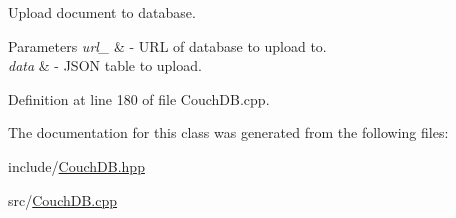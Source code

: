 Upload document to database. 


\begin{DoxyParams}{Parameters}
{\em url\+\_\+} & -\/ U\+RL of database to upload to. \\
\hline
{\em data} & -\/ J\+S\+ON table to upload. \\
\hline
\end{DoxyParams}


Definition at line 180 of file Couch\+D\+B.\+cpp.



The documentation for this class was generated from the following files\+:\begin{DoxyCompactItemize}
\item 
include/\hyperlink{_couch_d_b_8hpp}{Couch\+D\+B.\+hpp}\item 
src/\hyperlink{_couch_d_b_8cpp}{Couch\+D\+B.\+cpp}\end{DoxyCompactItemize}
